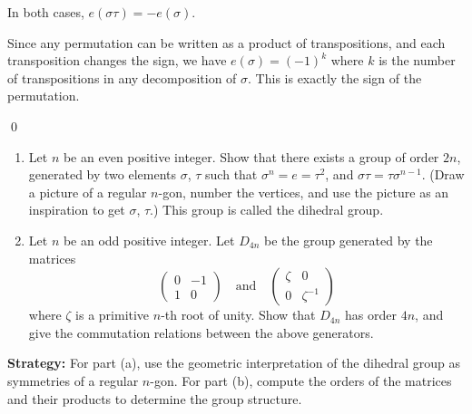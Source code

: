 In both cases, $e(\sigma\tau) = -e(\sigma)$.

Since any permutation can be written as a product of transpositions, and each transposition changes the sign, we have $e(\sigma) = (-1)^k$ where $k$ is the number of transpositions in any decomposition of $\sigma$. This is exactly the sign of the permutation.


\qed
\begin{problembox}
\begin{enumerate}[label=(\alph*)]
\item Let $n$ be an even positive integer. Show that there exists a group of order $2n$, generated by two elements $\sigma$, $\tau$ such that $\sigma^n = e = \tau^2$, and $\sigma\tau = \tau\sigma^{n-1}$. (Draw a picture of a regular $n$-gon, number the vertices, and use the picture as an inspiration to get $\sigma$, $\tau$.) This group is called the dihedral group.
\item Let $n$ be an odd positive integer. Let $D_{4n}$ be the group generated by the matrices
\[\begin{pmatrix}
0 & -1 \\
1 & 0 
\end{pmatrix} \quad \text{and} \quad \begin{pmatrix}
\zeta & 0 \\
0 & \zeta^{-1}
\end{pmatrix}\]
where $\zeta$ is a primitive $n$-th root of unity. Show that $D_{4n}$ has order $4n$, and give the commutation relations between the above generators.
\end{enumerate}
\end{problembox}

\noindent\textbf{Strategy:} For part (a), use the geometric interpretation of the dihedral group as symmetries of a regular $n$-gon. For part (b), compute the orders of the matrices and their products to determine the group structure.

